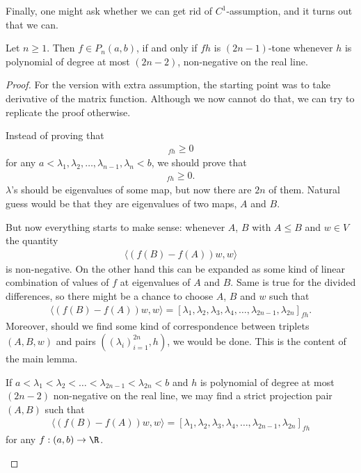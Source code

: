 Finally, one might ask whether we can get rid of $C^{1}$-assumption, and it turns out that we can.

\begin{lause}\label{main_theorem}
	Let $n \geq 1$. Then $f \in P_{n}(a, b)$, if and only if $f h$ is $(2 n - 1)$-tone whenever $h$ is polynomial of degree at most $(2 n - 2)$, non-negative on the real line. 
\end{lause}
\begin{proof}
	For the version with extra assumption, the starting point was to take derivative of the matrix function. Although we now cannot do that, we can try to replicate the proof otherwise.

	Instead of proving that
	\begin{align*}
		[\lambda_{1}, \lambda_{1}, \lambda_{2}, \lambda_{2}, \ldots, \lambda_{n}, \lambda_{n}]_{f h} \geq 0
	\end{align*}
	for any $a < \lambda_{1}, \lambda_{2}, \ldots, \lambda_{n - 1}, \lambda_{n} < b$, we should prove that
	\begin{align*}
		[\lambda_{1}, \lambda_{2}, \lambda_{3}, \lambda_{4}, \ldots, \lambda_{2n - 1}, \lambda_{2 n}]_{f h} \geq 0.
	\end{align*}
	$\lambda$'s should be eigenvalues of some map, but now there are $2 n$ of them. Natural guess would be that they are eigenvalues of two maps, $A$ and $B$.

	But now everything starts to make sense: whenever $A$, $B$ with $A \leq B$ and $w \in V$ the quantity
	\begin{align*}
		\langle (f(B) - f(A)) w, w \rangle
	\end{align*}
	is non-negative. On the other hand this can be expanded as some kind of linear combination of values of $f$ at eigenvalues of $A$ and $B$. Same is true for the divided differences, so there might be a chance to choose $A$, $B$ and $w$ such that
	\begin{align*}
		\langle (f(B) - f(A)) w, w \rangle = [\lambda_{1}, \lambda_{2}, \lambda_{3}, \lambda_{4}, \ldots, \lambda_{2n - 1}, \lambda_{2 n}]_{f h}.
	\end{align*}
	Moreover, should we find some kind of correspondence between triplets $(A, B, w)$ and pairs $((\lambda_{i})_{i = 1}^{2 n}, h)$, we would be done. This is the content of the main lemma.

	\begin{lem}\label{main_lemma}
		If $a < \lambda_{1} < \lambda_{2} < \ldots < \lambda_{2 n - 1} < \lambda_{2 n} < b$ and $h$ is polynomial of degree at most $(2 n - 2)$ non-negative on the real line, we may find a strict projection pair $(A, B)$ such that
		\begin{align*}
			\langle (f(B) - f(A)) w, w \rangle = [\lambda_{1}, \lambda_{2}, \lambda_{3}, \lambda_{4}, \ldots, \lambda_{2n - 1}, \lambda_{2 n}]_{f h}
		\end{align*}
		for any $f : (a, b) \to \R$.


\end{lem}
\end{proof}
